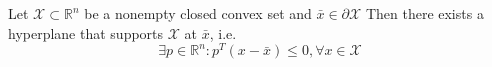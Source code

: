 Let $\mathcal{X} \subset \mathbb{R}^n$ be a nonempty closed convex set and $\bar{x} \in \partial \mathcal{X}$ 
Then there exists a hyperplane that supports $\mathcal{X}$ at $\bar{x}$, i.e.
$$\exists p \in \mathbb{R}^n : p^T (x - \bar{x}) \leq 0, \forall x \in \mathcal{X}$$ 
